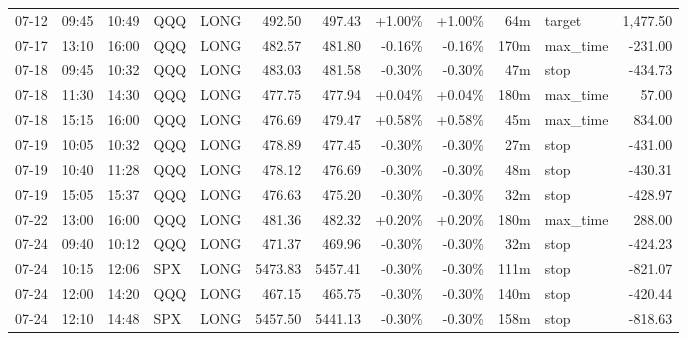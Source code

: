 \documentclass[11pt,a4paper]{article}
\begin{document}
\begin{center}
\begin{longtable}{>{\color{txtmain}}l l l l l r r r r r >{\color{txtmain}}l r}
07-12 & 09:45 & 10:49 & QQQ & LONG & 492.50 & 497.43 & \textcolor{wingreen}{+1.00\%} & \textcolor{wingreen}{+1.00\%} & 64m & target & \textcolor{wingreen}{1,477.50} \\
07-17 & 13:10 & 16:00 & QQQ & LONG & 482.57 & 481.80 & \textcolor{lossred}{-0.16\%} & \textcolor{lossred}{-0.16\%} & 170m & max\_time & \textcolor{lossred}{-231.00} \\
07-18 & 09:45 & 10:32 & QQQ & LONG & 483.03 & 481.58 & \textcolor{lossred}{-0.30\%} & \textcolor{lossred}{-0.30\%} & 47m & stop & \textcolor{lossred}{-434.73} \\
07-18 & 11:30 & 14:30 & QQQ & LONG & 477.75 & 477.94 & \textcolor{wingreen}{+0.04\%} & \textcolor{wingreen}{+0.04\%} & 180m & max\_time & \textcolor{wingreen}{57.00} \\
07-18 & 15:15 & 16:00 & QQQ & LONG & 476.69 & 479.47 & \textcolor{wingreen}{+0.58\%} & \textcolor{wingreen}{+0.58\%} & 45m & max\_time & \textcolor{wingreen}{834.00} \\
07-19 & 10:05 & 10:32 & QQQ & LONG & 478.89 & 477.45 & \textcolor{lossred}{-0.30\%} & \textcolor{lossred}{-0.30\%} & 27m & stop & \textcolor{lossred}{-431.00} \\
07-19 & 10:40 & 11:28 & QQQ & LONG & 478.12 & 476.69 & \textcolor{lossred}{-0.30\%} & \textcolor{lossred}{-0.30\%} & 48m & stop & \textcolor{lossred}{-430.31} \\
07-19 & 15:05 & 15:37 & QQQ & LONG & 476.63 & 475.20 & \textcolor{lossred}{-0.30\%} & \textcolor{lossred}{-0.30\%} & 32m & stop & \textcolor{lossred}{-428.97} \\
07-22 & 13:00 & 16:00 & QQQ & LONG & 481.36 & 482.32 & \textcolor{wingreen}{+0.20\%} & \textcolor{wingreen}{+0.20\%} & 180m & max\_time & \textcolor{wingreen}{288.00} \\
07-24 & 09:40 & 10:12 & QQQ & LONG & 471.37 & 469.96 & \textcolor{lossred}{-0.30\%} & \textcolor{lossred}{-0.30\%} & 32m & stop & \textcolor{lossred}{-424.23} \\
07-24 & 10:15 & 12:06 & SPX & LONG & 5473.83 & 5457.41 & \textcolor{lossred}{-0.30\%} & \textcolor{lossred}{-0.30\%} & 111m & stop & \textcolor{lossred}{-821.07} \\
07-24 & 12:00 & 14:20 & QQQ & LONG & 467.15 & 465.75 & \textcolor{lossred}{-0.30\%} & \textcolor{lossred}{-0.30\%} & 140m & stop & \textcolor{lossred}{-420.44} \\
07-24 & 12:10 & 14:48 & SPX & LONG & 5457.50 & 5441.13 & \textcolor{lossred}{-0.30\%} & \textcolor{lossred}{-0.30\%} & 158m & stop & \textcolor{lossred}{-818.63} \\

\end{longtable}
\end{center}
\end{document}
